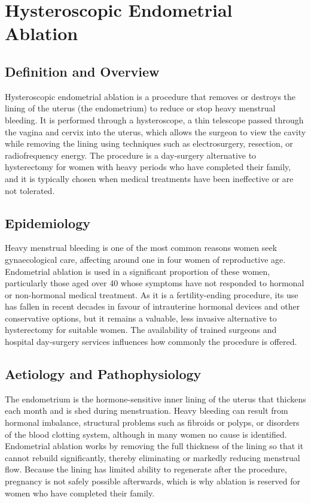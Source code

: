 \chapter{Hysteroscopic Endometrial Ablation}

\section*{Definition and Overview}
Hysteroscopic endometrial ablation is a procedure that removes or destroys the lining of the uterus (the endometrium) to reduce or stop heavy menstrual bleeding. It is performed through a hysteroscope, a thin telescope passed through the vagina and cervix into the uterus, which allows the surgeon to view the cavity while removing the lining using techniques such as electrosurgery, resection, or radiofrequency energy. The procedure is a day-surgery alternative to hysterectomy for women with heavy periods who have completed their family, and it is typically chosen when medical treatments have been ineffective or are not tolerated.

\section*{Epidemiology}
Heavy menstrual bleeding is one of the most common reasons women seek gynaecological care, affecting around one in four women of reproductive age. Endometrial ablation is used in a significant proportion of these women, particularly those aged over 40 whose symptoms have not responded to hormonal or non-hormonal medical treatment. As it is a fertility-ending procedure, its use has fallen in recent decades in favour of intrauterine hormonal devices and other conservative options, but it remains a valuable, less invasive alternative to hysterectomy for suitable women. The availability of trained surgeons and hospital day-surgery services influences how commonly the procedure is offered.

\section*{Aetiology and Pathophysiology}
The endometrium is the hormone-sensitive inner lining of the uterus that thickens each month and is shed during menstruation. Heavy bleeding can result from hormonal imbalance, structural problems such as fibroids or polyps, or disorders of the blood clotting system, although in many women no cause is identified. Endometrial ablation works by removing the full thickness of the lining so that it cannot rebuild significantly, thereby eliminating or markedly reducing menstrual flow. Because the lining has limited ability to regenerate after the procedure, pregnancy is not safely possible afterwards, which is why ablation is reserved for women who have completed their family.

